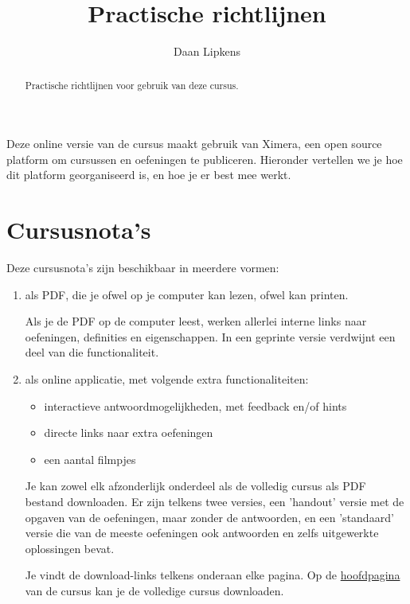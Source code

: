 \documentclass{ximera}
\title{Practische richtlijnen}
\author{Daan Lipkens}
\begin{document}
\begin{abstract}
    Practische richtlijnen voor gebruik van deze cursus.
\end{abstract}
\maketitle

Deze online versie van de cursus maakt gebruik van Ximera, een open source platform om cursussen en oefeningen te publiceren. Hieronder vertellen we je hoe dit platform georganiseerd is, en hoe je er best mee werkt.

\section*{Cursusnota's}
Deze cursusnota's zijn beschikbaar in meerdere vormen:
\begin{enumerate}
    \item als PDF, die je ofwel op je computer kan lezen, ofwel kan printen.
             
            Als je de PDF op de computer leest, werken allerlei interne links naar oefeningen, definities en eigenschappen. In een geprinte versie verdwijnt een deel van die functionaliteit.
     
             
 
   \item als online applicatie, met volgende extra functionaliteiten:
        \begin{itemize}
            \item interactieve antwoordmogelijkheden, met feedback en/of hints
            \item directe links naar extra oefeningen 
            \item een aantal filmpjes
        \end{itemize}
        Je kan zowel elk afzonderlijk onderdeel als de volledig cursus als PDF bestand downloaden. Er zijn telkens twee versies, een 'handout' versie met de opgaven van de oefeningen, maar zonder de antwoorden, en een 'standaard' versie die van de meeste oefeningen ook antwoorden en zelfs uitgewerkte oplossingen bevat.
        \begin{onlineOnly}
        Je vindt de download-links telkens onderaan elke pagina. Op de \href{https://xerxes.ximera.org/sui/5de/Cursus_DDO}{hoofdpagina} van de cursus kan je de volledige cursus downloaden.
         
        \end{onlineOnly}
 
\end{enumerate}
\end{document}
